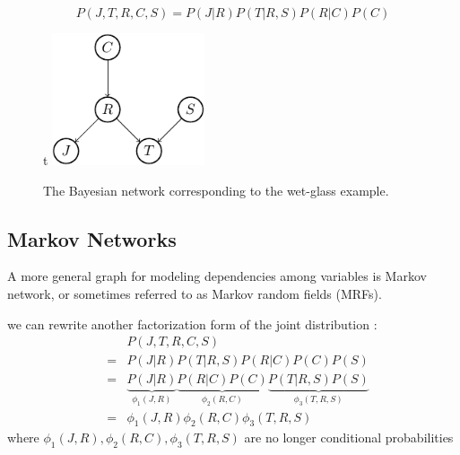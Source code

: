 \begin{equation}
 P(J,T,R,C,S)=P(J|R)P(T|R,S)P(R|C)P(C)
\end{equation}

\begin{figure}{t}
   \centering
   \includegraphics[width=0.4\textwidth]{./Figures/wet_glass_BN.pdf}
   \caption{The Bayesian network corresponding to the wet-glass example.}
\end{figure}

\subsection{Markov Networks}
A more general graph for modeling dependencies among variables is Markov network, or sometimes referred to as Markov random fields (MRFs).      

we can rewrite another factorization form of the joint distribution : 
\begin{equation*}
 \begin{array}{rcl}
   & & P(J,T,R,C,S)\\
   &=& P(J|R)P(T|R,S)P(R|C)P(C)P(S) \\
   &=& \underbrace{P(J|R)}_{\phi_1(J,R)} \underbrace{P(R|C)P(C)}_{\phi_2(R,C)} \underbrace{P(T|R,S)P(S)}_{\phi_3(T,R,S)}\\
   &=& \phi_1(J,R)\phi_2(R,C)\phi_3(T,R,S)
 \end{array}
\end{equation*}
where $\phi_1(J,R), \phi_2(R,C),\phi_3(T,R,S)$ are no longer conditional probabilities

